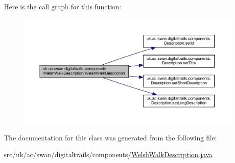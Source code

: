 Here is the call graph for this function\+:\nopagebreak
\begin{figure}[H]
\begin{center}
\leavevmode
\includegraphics[width=350pt]{classuk_1_1ac_1_1swan_1_1digitaltrails_1_1components_1_1_welsh_walk_description_a27635e3b6262e73d473ddaa9ffccad91_cgraph}
\end{center}
\end{figure}




The documentation for this class was generated from the following file\+:\begin{DoxyCompactItemize}
\item 
src/uk/ac/swan/digitaltrails/components/\hyperlink{_welsh_walk_description_8java}{Welsh\+Walk\+Description.\+java}\end{DoxyCompactItemize}
